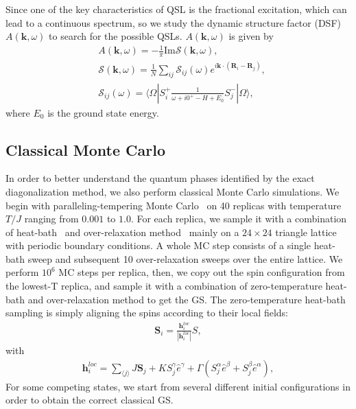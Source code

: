 \documentclass[aps,prb,reprint,amsfonts,amsmath,amssymb,showpacs,groupedaddress,superscriptaddress]{revtex4-1}
\begin{document}
Since one of the key characteristics of QSL is the fractional excitation, which can lead to a continuous spectrum, so we study the dynamic structure factor (DSF) $A(\bm{k}, \omega)$ to search for the possible QSLs. $A(\bm{k}, \omega)$ is given by
\begin{align}
    & A(\bm{k}, \omega) = -\frac{1}{\pi} \text{Im} \mathcal{S}(\bm{k}, \omega), \label{eq:Akomega} \\
    & \mathcal{S}(\bm{k}, \omega) = \frac{1}{N} \sum_{ij} \mathcal{S}_{ij}(\omega) e^{i \bm{k} \cdot (\bm{R}_i - \bm{R}_j)}, \\
    & \mathcal{S}_{ij}(\omega) = \langle \Omega | S_i^{+} \frac{1}{\omega + i0^{+} - H + E_0} S_j^{-} | \Omega \rangle, \label{eq:GreenFunction}
\end{align}
where $E_0$ is the ground state energy.

\subsection{\label{subsec:MethodMC}Classical Monte Carlo}

In order to better understand the quantum phases identified by the exact diagonalization method, we also perform classical Monte Carlo simulations. We begin with paralleling-tempering Monte Carlo~\cite{Hukushima96} on 40 replicas with temperature $T/J$ ranging from $0.001$ to $1.0$. For each replica, we sample it with a combination of heat-bath~\cite{Miyatake84} and over-relaxation method~\cite{Berg} mainly on a $24\times 24$ triangle lattice with periodic boundary conditions. A whole MC step consists of a single heat-bath sweep and subsequent 10 over-relaxation sweeps over the entire lattice. We perform $10^6$ MC steps per replica, then, we copy out the spin configuration from the lowest-T replica, and sample it with a combination of zero-temperature heat-bath and over-relaxation method to get the GS. The zero-temperature heat-bath sampling is simply aligning the spins according to their local fields:
\begin{align}
    \bm{S}_i = \frac{\bm{h}_i^{loc}}{|\bm{h}_i^{loc}|} S,
\end{align}
with
\begin{align}
    \bm{h}_i^{loc} = \sum_{\langle j \rangle} J \bm{S}_j + K {S}^{\gamma}_j \hat{e}^{\gamma} + \Gamma (S^\alpha_j \hat{e}^{\beta} + S^\beta_j \hat{e}^\alpha),
\end{align}
For some competing states, we start from several different initial configurations in order to obtain the correct classical GS.
\end{document}

